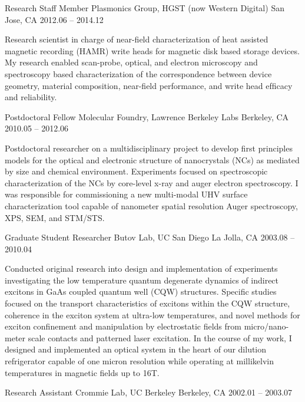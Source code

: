 \begin{cventries}
  \cventry
    {Research Staff Member}
    {Plasmonics Group, HGST (now Western Digital)}
    {San Jose, CA}
    {2012.06 -- 2014.12}
    {
      \begin{cvitems}
        Research scientist in charge of near-ﬁeld characterization of heat assisted magnetic recording (HAMR) write heads for magnetic disk based storage devices. My research enabled scan-probe, optical, and electron microscopy and spectroscopy based characterization of the correspondence between device geometry, material composition, near-ﬁeld performance, and write head efﬁcacy and reliability.
      \end{cvitems}
    }
  \cventry
    {Postdoctoral Fellow}
    {Molecular Foundry, Lawrence Berkeley Labs}
    {Berkeley, CA}
    {2010.05 -- 2012.06}
    {
      \begin{cvitems}
        Postdoctoral researcher on a multidisciplinary project to develop ﬁrst principles models for the optical and electronic structure of nanocrystals (NCs) as mediated by size and chemical environment. Experiments focused on spectroscopic characterization of the NCs by core-level x-ray and auger electron spectroscopy. I was responsible for commissioning a new multi-modal UHV surface characterization tool capable of nanometer spatial resolution Auger spectroscopy, XPS, SEM, and STM/STS.
      \end{cvitems}
    }
  \cventry
    {Graduate Student Researcher}
    {Butov Lab, UC San Diego}
    {La Jolla, CA}
    {2003.08 -- 2010.04}
    {
      \begin{cvitems}
        Conducted original research into design and implementation of experiments investigating the low temperature quantum degenerate dynamics of indirect excitons in GaAs coupled quantum well (CQW) structures. Speciﬁc studies focused on the transport characteristics of excitons within the CQW structure, coherence in the exciton system at ultra-low temperatures, and novel methods for exciton conﬁnement and manipulation by electrostatic ﬁelds from micro/nano-meter scale contacts and patterned laser excitation. In the course of my work, I designed and implemented an optical system in the heart of our dilution refrigerator capable of one micron resolution while operating at millikelvin temperatures in magnetic ﬁelds up to 16T.
      \end{cvitems} 
    }
  \cventry
    {Research Assistant}
    {Crommie Lab, UC Berkeley}
    {Berkeley, CA}
    {2002.01 -- 2003.07}

\end{cventries}
